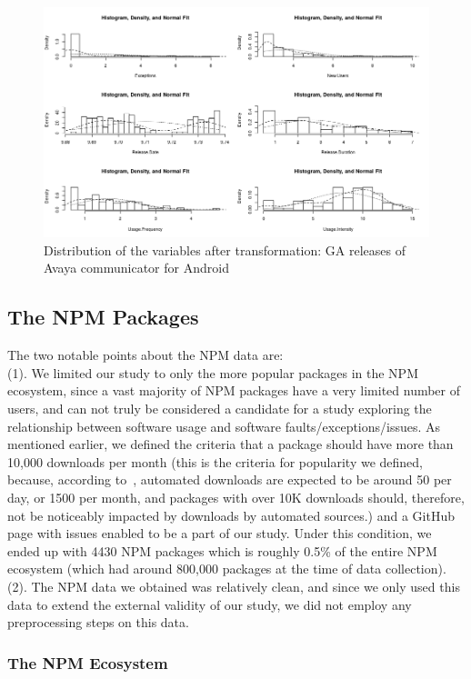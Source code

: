 \documentclass[smallcondensed]{svjour3}     %
\begin{document}
\begin{figure}[!t]
\centering
\includegraphics[width=0.9\linewidth]{distr}%
\caption{Distribution of the variables after transformation: GA releases of Avaya communicator for Android}
\label{fig:distr}
\vspace{-10pt}
\end{figure}

\subsection{The NPM Packages}
The two notable points about the NPM data are:\\ (1). We limited our study to only the more popular packages in the NPM ecosystem, since a vast majority of NPM packages have a very limited number of users, and can not truly be considered a candidate for a study exploring the relationship between software usage and software faults/exceptions/issues. As mentioned earlier, we defined the criteria that a package should have more than 10,000 downloads per month (this is the criteria for popularity we defined, because, according to~\cite{npmdl}, automated downloads are expected to be
around 50 per day, or 1500 per month, and packages with over 10K
downloads should, therefore, not be noticeably impacted by 
 downloads by automated sources.) and a GitHub page with issues enabled to be a part of our study. Under this condition, we ended up with 4430 NPM packages which is roughly 0.5\% of the entire NPM ecosystem (which had around 800,000 packages at the time of data collection).\\
(2). The NPM data we obtained was relatively clean, and since we only used this data to extend the external validity of our study, we did not employ any preprocessing steps on this data. 

\subsubsection{The NPM Ecosystem}
\end{document}
